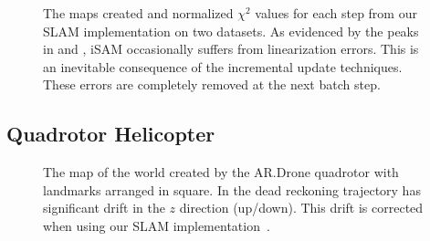 \documentclass[conference]{IEEEtran}
\begin{document}
\begin{figure}[!t]
\begin{center}
{      \label{fig:victoriaChi2}}
  \end{center}
  \caption{The maps created and normalized $\chi^2$ values for each step from our SLAM
    implementation on two datasets.  As evidenced by the peaks in
     and , iSAM occasionally suffers
    from linearization errors. This is an inevitable consequence of the incremental update
    techniques. These errors are completely removed at the next batch step.}
  \label{fig:manhattan}
\end{figure}


\subsection{Quadrotor Helicopter}
\label{sub:results}

\begin{figure}[!t]
  \begin{center}
    \caption{The map of the world created by the AR.Drone quadrotor with landmarks
      arranged in square.  In  the dead reckoning trajectory has
      significant drift in the $z$ direction (up/down).  This drift is corrected when
      using our \ac{SLAM} implementation~.}
    \label{fig:mapadjustment}
  \end{center}
\end{figure}
\end{document}

